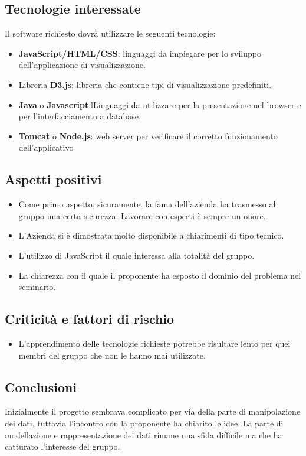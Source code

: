 \subsection{Tecnologie interessate}
Il software richiesto dovrà utilizzare le seguenti tecnologie:
\begin{itemize}
	\item \textbf{JavaScript/HTML/CSS}: linguaggi da impiegare per lo sviluppo dell'applicazione di visualizzazione.
	\item Libreria \textbf{D3.js}: libreria che contiene tipi di visualizzazione predefiniti.
	\item \textbf{Java} o \textbf{Javascript}:lLinguaggi da utilizzare per la presentazione nel browser e per l'interfacciamento a database.
	\item \textbf{Tomcat} o \textbf{Node.js}: web server per verificare il corretto funzionamento dell'applicativo
\end{itemize}
\subsection{Aspetti positivi}
\begin{itemize}
	\item Come primo aspetto, sicuramente, la fama dell'azienda ha trasmesso al gruppo una certa sicurezza. Lavorare con esperti è sempre un onore.
	\item L'Azienda si è dimostrata molto disponibile a chiarimenti di tipo tecnico.
	\item L'utilizzo di JavaScript il quale interessa alla totalità del gruppo.
	\item La chiarezza con il quale il proponente ha esposto il dominio del problema nel seminario.
\end{itemize}
\subsection{Criticità e fattori di rischio}
\begin{itemize}
	\item L'apprendimento delle tecnologie richieste potrebbe risultare lento per quei membri del gruppo che non le hanno mai utilizzate.
\end{itemize}
\subsection{Conclusioni}
Inizialmente il progetto sembrava complicato per via della parte di manipolazione dei dati, tuttavia l'incontro con la proponente ha chiarito le idee. La parte di modellazione e rappresentazione dei dati rimane una sfida difficile ma che ha catturato l'interesse del gruppo.